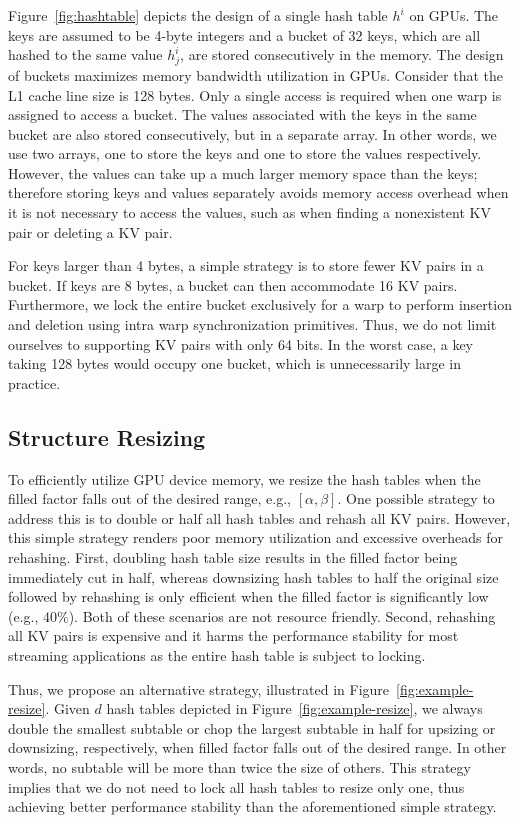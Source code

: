 Figure~\ref{fig:hashtable} depicts the design of a single hash table $h^i$ on GPUs. 
The keys are assumed to be 4-byte integers and a bucket of 32 keys, which are all hashed to the same value $h^i_j$, are stored consecutively in the memory. 
The design of buckets maximizes memory bandwidth utilization in GPUs. 
Consider that the L1 cache line size is 128 bytes. Only a single access is required when one warp is assigned to access a bucket. 
The values associated with the keys in the same bucket are also stored consecutively, but in a separate array.  
In other words, we use two arrays, one to store the keys and one to store the values respectively.
However, the values can take up a much larger memory space than the keys; therefore storing keys and values separately avoids memory access overhead when it is not necessary to access the values, such as when finding a nonexistent KV pair or deleting a KV pair. 

For keys larger than 4 bytes, a simple strategy is to store fewer KV pairs in a bucket. If keys are 8 bytes, a bucket can then accommodate 16 KV pairs. 
Furthermore, we lock the entire bucket exclusively for a warp to perform insertion and deletion using intra warp synchronization primitives. Thus, we do not limit ourselves to supporting KV pairs with only 64 bits. 
In the worst case, a key taking 128 bytes would occupy one bucket, which is unnecessarily large in practice.

\subsection{Structure Resizing}\label{sec:dyn:resize}
To efficiently utilize GPU device memory, we resize the hash tables when the filled factor falls out of the desired range, e.g., $[\alpha,\beta]$.
One possible strategy to address this is to double or half all hash tables and rehash all KV pairs. However, this simple strategy renders poor memory utilization and 
excessive overheads for rehashing. First, doubling hash table size results in the filled factor being immediately cut in half, whereas downsizing hash tables to half the original size followed by rehashing is only efficient when the filled factor is significantly low (e.g., $40\%$). Both of these scenarios are not resource friendly. Second, rehashing all KV pairs is expensive and it harms the performance stability for most streaming applications as the entire hash table is subject to locking. 

Thus, we propose an alternative strategy, illustrated in Figure~\ref{fig:example-resize}.
Given $d$ hash tables depicted in Figure~\ref{fig:example-resize},
we always double the smallest subtable or chop the largest subtable in half for upsizing or downsizing, respectively, when filled factor falls out of the desired range. 
In other words, no subtable will be more than twice the size of others. This strategy implies that we do not need to lock all hash tables to resize only one, thus achieving better performance stability than the aforementioned simple strategy. 



